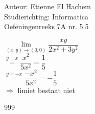 \documentclass[a4paper]{article}
\begin{document}
  
\noindent \large Auteur: Etienne El Hachem \\
\noindent \large Studierichting: Informatica\\
\noindent \large Oefeningenreeks 7A nr. 5.5\\

\medskip

\normalsize

$ \lim\limits_{(x,y)\rightarrow (0,0)}\dfrac{xy}{2x^2+3y^2} $\\

$ \stackrel{y = x}{=} \dfrac{x^2}{5x^2} = \dfrac{1}{5} $\\

$ \stackrel{y = -x}{=} \dfrac{-x^2}{5x^2} = -\dfrac{1}{5} $ \\

$ \Rightarrow $ limiet bestaat niet \\

\begin{thebibliography}{999}
\end{thebibliography}
\end{document}
